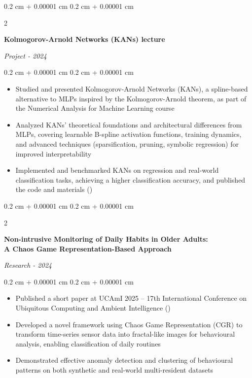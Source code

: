 \documentclass[10pt, letterpaper]{article}
\newenvironment{highlights}{
    \begin{itemize}[
        topsep=0.10 cm,
        parsep=0.10 cm,
        partopsep=0pt,
        itemsep=0pt,
        leftmargin=0.4 cm + 10pt
    ]
}{
    \end{itemize}
} %
\newenvironment{onecolentry}{
    \begin{adjustwidth}{
        0.2 cm + 0.00001 cm
    }{
        0.2 cm + 0.00001 cm
    }
}{
    \end{adjustwidth}
} %
\newenvironment{twocolentry}[2][]{
    \onecolentry
    \def\secondColumn{#2}
    \setcolumnwidth{\fill, 4.5 cm}
    \begin{paracol}{2}
}{
    \switchcolumn \raggedleft \secondColumn
    \end{paracol}
    \endonecolentry
} %
\let\hrefWithoutArrow\href
\renewcommand{\href}[2]{\hrefWithoutArrow{#1}{\ifthenelse{\equal{#2}{}}{ }{#2 }\raisebox{.15ex}{\footnotesize \faExternalLink*}}}
\begin{document}
\vspace{0.20 cm}
\begin{twocolentry}{\textit{Project - 2024}}
    \textbf{Kolmogorov-Arnold Networks (KANs) lecture}
\end{twocolentry}
\vspace{0.10 cm}
\begin{onecolentry}
    \begin{highlights}
        \item Studied and presented Kolmogorov-Arnold Networks (KANs), a spline-based alternative to MLPs inspired by the Kolmogorov-Arnold theorem, as part of the Numerical Analysis for Machine Learning course
        \item Analyzed KANs' theoretical foundations and architectural differences from MLPs, covering learnable B-spline activation functions, training dynamics, and advanced techniques (sparsification, pruning, symbolic regression) for improved interpretability
        \item Implemented and benchmarked KANs on regression and real-world classification tasks, achieving a higher classification accuracy, and published the code and materials (\href{https://github.com/matteopasqual02/KAN-naml.git}{GitHub})
    \end{highlights}
\end{onecolentry}

\vspace{0.20 cm}
\begin{twocolentry}{\textit{Research - 2024}}
    \textbf{Non-intrusive Monitoring of Daily Habits in Older Adults: \\ A Chaos Game Representation-Based Approach}
\end{twocolentry}
\vspace{0.10 cm}
\begin{onecolentry}
    \begin{highlights}
        \item Published a short paper at UCAmI 2025 -- 17th International Conference on Ubiquitous Computing and Ambient Intelligence (\href{https://doi.org/10.1007/978-3-032-16992-1_20}{Paper})
        \item Developed a novel framework using Chaos Game Representation (CGR) to transform time-series sensor data into fractal-like images for behavioural analysis, enabling classification of daily routines
        \item Demonstrated effective anomaly detection and clustering of behavioural patterns on both synthetic and real-world multi-resident datasets
    \end{highlights}
\end{onecolentry}
\end{document}

